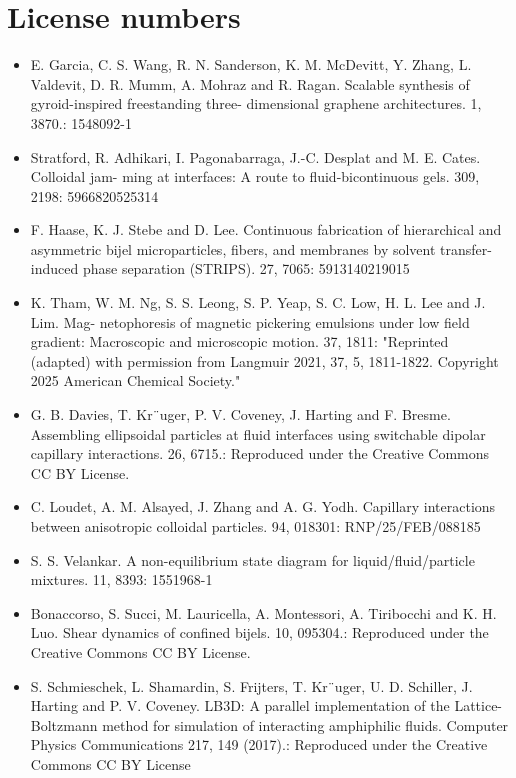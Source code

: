 \section{License numbers}

\begin{itemize}
    \item E. Garcia, C. S. Wang, R. N. Sanderson, K. M. McDevitt, Y. Zhang, L. Valdevit, D. R.
    Mumm, A. Mohraz and R. Ragan. Scalable synthesis of gyroid-inspired freestanding three-
    dimensional graphene architectures. 1, 3870.: 1548092-1
    \item Stratford, R. Adhikari, I. Pagonabarraga, J.-C. Desplat and M. E. Cates. Colloidal jam-
    ming at interfaces: A route to fluid-bicontinuous gels. 309, 2198: 5966820525314
    \item F. Haase, K. J. Stebe and D. Lee. Continuous fabrication of hierarchical and asymmetric
    bijel microparticles, fibers, and membranes by solvent transfer-induced phase separation
    (STRIPS). 27, 7065: 5913140219015
    \item K. Tham, W. M. Ng, S. S. Leong, S. P. Yeap, S. C. Low, H. L. Lee and J. Lim. Mag-
    netophoresis of magnetic pickering emulsions under low field gradient: Macroscopic and
    microscopic motion. 37, 1811: "Reprinted (adapted) with permission from 
    Langmuir 2021, 37, 5, 1811-1822. Copyright 2025 American Chemical Society."
    \item G. B. Davies, T. Kr¨uger, P. V. Coveney, J. Harting and F. Bresme. Assembling ellipsoidal
    particles at fluid interfaces using switchable dipolar capillary interactions. 26, 6715.: Reproduced under the Creative Commons CC BY License.
    \item C. Loudet, A. M. Alsayed, J. Zhang and A. G. Yodh. Capillary interactions between
    anisotropic colloidal particles. 94, 018301: RNP/25/FEB/088185
    \item S. S. Velankar. A non-equilibrium state diagram for liquid/fluid/particle mixtures. 11, 8393: 1551968-1
    \item Bonaccorso, S. Succi, M. Lauricella, A. Montessori, A. Tiribocchi and K. H. Luo. Shear
    dynamics of confined bijels. 10, 095304.: Reproduced under the Creative Commons CC BY License.
    \item S. Schmieschek, L. Shamardin, S. Frijters, T. Kr¨uger, U. D. Schiller, J. Harting and P. V.
    Coveney. LB3D: A parallel implementation of the Lattice-Boltzmann method for simulation
    of interacting amphiphilic fluids. Computer Physics Communications 217, 149 (2017).: Reproduced under the Creative Commons CC BY License
\end{itemize}

